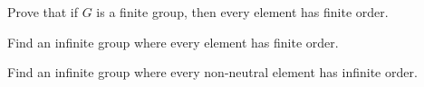 \begin{myenum}
  \item Prove that
  if $G$ is a finite group, then every element has finite order.
 
  \item Find an infinite group where every element has finite
  order.

  \item Find an infinite group where every non-neutral element
  has infinite order.
  
  \end{myenum}
